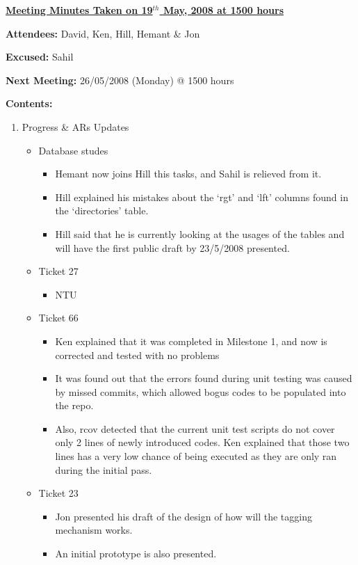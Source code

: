 \documentclass{letter}
\begin{document}
{\large \textbf{\underline{Meeting Minutes Taken on 19$^{th}$ May, 2008 at 1500 hours}}}

\textbf{Attendees:} David, Ken, Hill, Hemant \& Jon 

\textbf{Excused:} Sahil 

\textbf{Next Meeting:} 26/05/2008 (Monday) @ 1500 hours 

\textbf{Contents:}

\begin{enumerate}
	\item Progress \& ARs Updates
		\begin{itemize}
			\item Database studes
				\begin{itemize}
					\item Hemant now joins Hill this tasks, and Sahil is relieved from it.  
					\item Hill explained his mistakes about the `rgt' and `lft' columns found in the `directories' table. 
						\item Hill said that he is currently looking at the usages of the tables and will have the first public draft by 23/5/2008 presented. 
				\end{itemize}
			\item Ticket 27
				\begin{itemize}
					\item NTU
				\end{itemize}
			\item Ticket 66
				\begin{itemize}
					\item Ken explained that it was completed in Milestone 1, and now is corrected and tested with no problems
						\item It was found out that the errors found during unit testing was caused by missed commits, which allowed bogus codes to be populated into the repo. 
						\item Also, rcov detected that the current unit test scripts do not cover only 2 lines of newly introduced codes. Ken explained that those two lines has a very low chance of being executed as they are only ran during the initial pass. 
				\end{itemize}
			\item Ticket 23
				\begin{itemize}
					\item Jon presented his draft of the design of how will the tagging mechanism works.
						\item An initial prototype is also presented. 

\end{itemize}
\end{itemize}
\end{enumerate}
\end{document}
